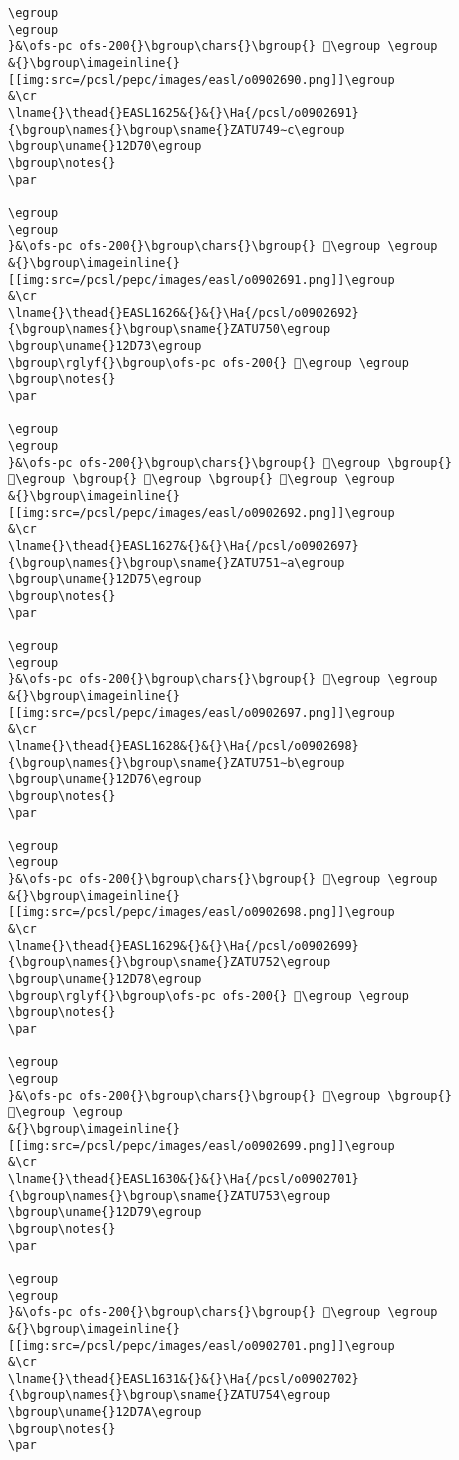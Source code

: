 \begin{verbatim}
\egroup
\egroup
}&\ofs-pc ofs-200{}\bgroup\chars{}\bgroup{} 𒵯\egroup \egroup
&{}\bgroup\imageinline{}[[img:src=/pcsl/pepc/images/easl/o0902690.png]]\egroup
&\cr
\lname{}\thead{}EASL1625&{}&{}\Ha{/pcsl/o0902691}{\bgroup\names{}\bgroup\sname{}ZATU749∼c\egroup
\bgroup\uname{}12D70\egroup
\bgroup\notes{}
\par 

\egroup
\egroup
}&\ofs-pc ofs-200{}\bgroup\chars{}\bgroup{} 𒵰\egroup \egroup
&{}\bgroup\imageinline{}[[img:src=/pcsl/pepc/images/easl/o0902691.png]]\egroup
&\cr
\lname{}\thead{}EASL1626&{}&{}\Ha{/pcsl/o0902692}{\bgroup\names{}\bgroup\sname{}ZATU750\egroup
\bgroup\uname{}12D73\egroup
\bgroup\rglyf{}\bgroup\ofs-pc ofs-200{} 𒵳\egroup \egroup
\bgroup\notes{}
\par 

\egroup
\egroup
}&\ofs-pc ofs-200{}\bgroup\chars{}\bgroup{} 𒵱\egroup \bgroup{} 𒵲\egroup \bgroup{} 𒵳\egroup \bgroup{} 𒵴\egroup \egroup
&{}\bgroup\imageinline{}[[img:src=/pcsl/pepc/images/easl/o0902692.png]]\egroup
&\cr
\lname{}\thead{}EASL1627&{}&{}\Ha{/pcsl/o0902697}{\bgroup\names{}\bgroup\sname{}ZATU751∼a\egroup
\bgroup\uname{}12D75\egroup
\bgroup\notes{}
\par 

\egroup
\egroup
}&\ofs-pc ofs-200{}\bgroup\chars{}\bgroup{} 𒵵\egroup \egroup
&{}\bgroup\imageinline{}[[img:src=/pcsl/pepc/images/easl/o0902697.png]]\egroup
&\cr
\lname{}\thead{}EASL1628&{}&{}\Ha{/pcsl/o0902698}{\bgroup\names{}\bgroup\sname{}ZATU751∼b\egroup
\bgroup\uname{}12D76\egroup
\bgroup\notes{}
\par 

\egroup
\egroup
}&\ofs-pc ofs-200{}\bgroup\chars{}\bgroup{} 𒵶\egroup \egroup
&{}\bgroup\imageinline{}[[img:src=/pcsl/pepc/images/easl/o0902698.png]]\egroup
&\cr
\lname{}\thead{}EASL1629&{}&{}\Ha{/pcsl/o0902699}{\bgroup\names{}\bgroup\sname{}ZATU752\egroup
\bgroup\uname{}12D78\egroup
\bgroup\rglyf{}\bgroup\ofs-pc ofs-200{} 𒵸\egroup \egroup
\bgroup\notes{}
\par 

\egroup
\egroup
}&\ofs-pc ofs-200{}\bgroup\chars{}\bgroup{} 𒵷\egroup \bgroup{} 𒵸\egroup \egroup
&{}\bgroup\imageinline{}[[img:src=/pcsl/pepc/images/easl/o0902699.png]]\egroup
&\cr
\lname{}\thead{}EASL1630&{}&{}\Ha{/pcsl/o0902701}{\bgroup\names{}\bgroup\sname{}ZATU753\egroup
\bgroup\uname{}12D79\egroup
\bgroup\notes{}
\par 

\egroup
\egroup
}&\ofs-pc ofs-200{}\bgroup\chars{}\bgroup{} 𒵹\egroup \egroup
&{}\bgroup\imageinline{}[[img:src=/pcsl/pepc/images/easl/o0902701.png]]\egroup
&\cr
\lname{}\thead{}EASL1631&{}&{}\Ha{/pcsl/o0902702}{\bgroup\names{}\bgroup\sname{}ZATU754\egroup
\bgroup\uname{}12D7A\egroup
\bgroup\notes{}
\par 


\end{verbatim}
